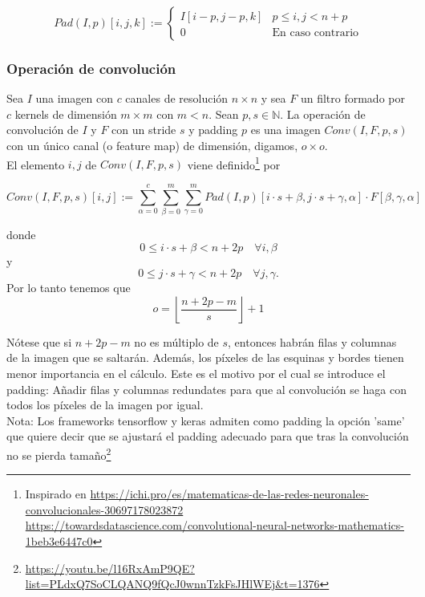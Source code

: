 \documentclass{article}
\begin{document}
$$Pad(I,p)[i,j,k]:=\begin{cases}
  I[i-p,j-p,k] & p\leq i,j<n+p\\
  0 & \text{En caso contrario}
\end{cases} $$


\subsubsection{Operación de convolución}
Sea $I$ una imagen con $c$ canales de resolución $n\times n$ y sea $F$ un filtro formado por $c$ kernels de dimensión $m\times m$ con $m<n$. Sean $p,s\in \mathbb{N}$. La operación de convolución de $I$ y $F$ con un stride $s$ y padding $p$ es una imagen $Conv(I,F,p,s)$ con un único canal (o feature map) de dimensión, digamos, $o\times o$.\\


El elemento $i,j$ de $Conv(I,F,p,s)$ viene definido\footnote{Inspirado en \url{https://ichi.pro/es/matematicas-de-las-redes-neuronales-convolucionales-30697178023872}  \url{https://towardsdatascience.com/convolutional-neural-networks-mathematics-1beb3e6447c0}} por


$$Conv(I,F,p,s)[i,j]:=\sum_{\alpha=0}^c \sum_{\beta=0}^m \sum_{\gamma=0}^m Pad(I,p)[i\cdot s+\beta,j\cdot s+\gamma,\alpha]\cdot  F[\beta,\gamma,\alpha]$$

donde 
$$0\leq i\cdot s+\beta <n+2p \quad \forall i,\beta $$
y
$$0\leq j\cdot s+\gamma <n+2p \quad \forall j,\gamma .$$
Por lo tanto tenemos que  
$$o=\left\lfloor \frac{n+2p-m}{s}\right\rfloor+1$$

Nótese que si $n+2p-m$ no es múltiplo de $s$, entonces habrán filas y columnas de la imagen que se saltarán. Además, los píxeles de las esquinas y bordes tienen menor importancia en el cálculo. Este es el motivo por el cual se introduce el padding: Añadir filas y columnas redundates para que al convolución se haga con todos los píxeles de la imagen por igual.\\

Nota: Los frameworks tensorflow y keras admiten como padding la opción 'same' que quiere decir que se ajustará el padding adecuado para que tras la convolución no se pierda tamaño\footnote{\url{https://youtu.be/l16RxAmP9QE?list=PLdxQ7SoCLQANQ9fQcJ0wnnTzkFsJHlWEj&t=1376}}
\end{document}
